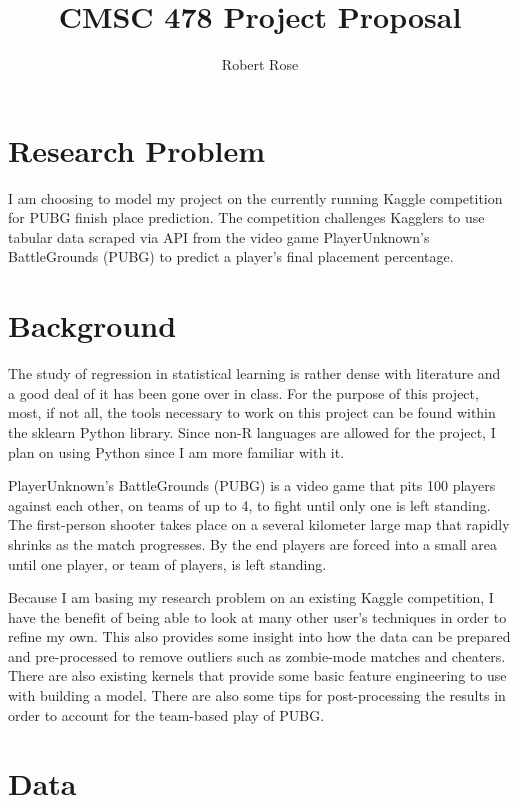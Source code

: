 \documentclass[11pt]{article}
\title{CMSC 478 Project Proposal}
\author{Robert Rose}
\makeatletter
\let\inserttitle\@title
\let\insertauthor\@author
\makeatother
\begin{document}
\begin{center}
  \LARGE{\inserttitle}

  \Large{\insertauthor}
\end{center}

\section{Research Problem}

I am choosing to model my project on the currently running Kaggle competition for PUBG finish place
prediction.\cite{competition} The competition challenges Kagglers to use tabular data scraped via
API from the video game PlayerUnknown's BattleGrounds (PUBG) to predict a player's final placement
percentage. 

\section{Background}

The study of regression in statistical learning is rather dense with literature and a good deal of
it has been gone over in class. For the purpose of this project, most, if not all, the tools
necessary to work on this project can be found within the sklearn Python library.\cite{scikit-learn}
Since non-R languages are allowed for the project, I plan on using Python since I am more familiar 
with it.

PlayerUnknown's BattleGrounds (PUBG) is a video game that pits 100 players against each other, on
teams of up to 4, to fight until only one is left standing. The first-person shooter takes place on
a several kilometer large map that rapidly shrinks as the match progresses. By the end players are
forced into a small area until one player, or team of players, is left standing.

Because I am basing my research problem on an existing Kaggle competition, I have the benefit of
being able to look at many other user's techniques in order to refine my own. This also provides
some insight into how the data can be prepared and pre-processed to remove outliers such as
zombie-mode matches and cheaters.\cite{rejasupotaro} There are also existing kernels that provide
some basic feature engineering to use with building a model.\cite{lepelaars} There are also some
tips for post-processing the results in order to account for the team-based play of
PUBG.\cite{post-process}

\section{Data}
\end{document}
